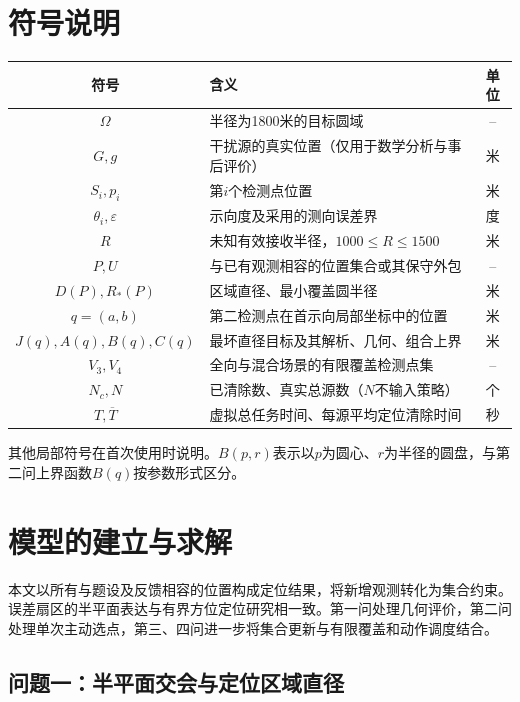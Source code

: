 \documentclass{JXUSTmodeling}
\begin{document}
\section{符号说明}\label{sec:4}
\begin{table}[htbp]
\centering
\begin{tabularx}{\textwidth}{cXc}
\toprule
符号 & 含义 & 单位\\
\midrule
$\Omega$ & 半径为1800米的目标圆域 & --\\
$G,g$ & 干扰源的真实位置（仅用于数学分析与事后评价） & 米\\
$S_i,p_i$ & 第$i$个检测点位置 & 米\\
$\theta_i,\varepsilon$ & 示向度及采用的测向误差界 & 度\\
$R$ & 未知有效接收半径，$1000\le R\le1500$ & 米\\
$P,U$ & 与已有观测相容的位置集合或其保守外包 & --\\
$D(P),R_*(P)$ & 区域直径、最小覆盖圆半径 & 米\\
$q=(a,b)$ & 第二检测点在首示向局部坐标中的位置 & 米\\
$J(q),A(q),B(q),C(q)$ & 最坏直径目标及其解析、几何、组合上界 & 米\\
$V_3,V_4$ & 全向与混合场景的有限覆盖检测点集 & --\\
$N_c,N$ & 已清除数、真实总源数（$N$不输入策略） & 个\\
$T,\overline T$ & 虚拟总任务时间、每源平均定位清除时间 & 秒\\
\bottomrule
\end{tabularx}
\end{table}
其他局部符号在首次使用时说明。$B(p,r)$表示以$p$为圆心、$r$为半径的圆盘，与第二问上界函数$B(q)$按参数形式区分。

\section{模型的建立与求解}\label{sec:5}
本文以所有与题设及反馈相容的位置构成定位结果，将新增观测转化为集合约束。误差扇区的半平面表达与有界方位定位研究相一致\cite{gholami2015}。第一问处理几何评价，第二问处理单次主动选点，第三、四问进一步将集合更新与有限覆盖和动作调度结合。

\subsection{问题一：半平面交会与定位区域直径}
\label{sub:model_p1}
\end{document}
